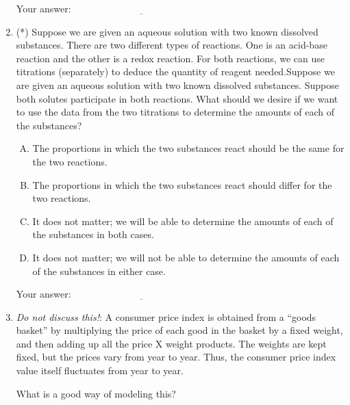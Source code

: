 \documentclass[10pt]{amsart}
\begin{document}
\begin{enumerate}
  \vspace{0.1in}
  Your answer: $\underline{\qquad\qquad\qquad\qquad\qquad\qquad\qquad}$
  \vspace{0.1in}

\item (*) Suppose we are given an aqueous solution with two known
  dissolved substances. There are two different types of
  reactions. One is an acid-base reaction and the other is a redox
  reaction. For both reactions, we can use titrations (separately) to
  deduce the quantity of reagent needed.Suppose we are given an
  aqueous solution with two known dissolved substances. Suppose both
  solutes participate in both reactions. What should we desire if we
  want to use the data from the two titrations to determine the
  amounts of each of the substances?

  \begin{enumerate}[(A)]
  \item The proportions in which the two substances react should be
    the same for the two reactions.
  \item The proportions in which the two substances react should
    differ for the two reactions.
  \item It does not matter; we will be able to determine the amounts
    of each of the substances in both cases.
  \item It does not matter; we will not be able to determine the
    amounts of each of the substances in either case.
  \end{enumerate}

  \vspace{0.1in}
  Your answer: $\underline{\qquad\qquad\qquad\qquad\qquad\qquad\qquad}$
  \vspace{0.1in}

\item {\em Do not discuss this!}: A consumer price index is obtained
  from a ``goods basket'' by multiplying the price of each good in the
  basket by a fixed weight, and then adding up all the price X weight
  products. The weights are kept fixed, but the prices vary from year
  to year. Thus, the consumer price index value itself fluctuates from
  year to year.
  
  What is a good way of modeling this?


\end{enumerate}
\end{document}
